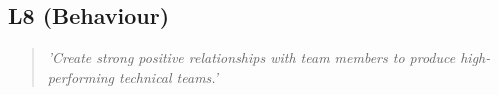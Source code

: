 \subsection{L8 (Behaviour)}

  \begin{quote}
    \textit{'Create strong positive relationships with
    team members to produce high-performing technical
    teams.'}
  \end{quote}

\newpage